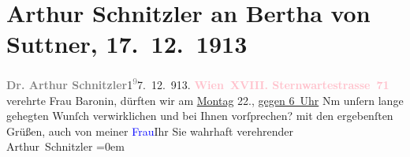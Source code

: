 

               \section[Arthur Schnitzler an Bertha von Suttner, 17. 12. 1913]{ Arthur Schnitzler an Bertha von Suttner,
                    17. 12. 1913}\nopagebreak{}\rehead{ }\normalsize\beginnumbering{} \toendnotes[C]{\smallbreak\pagebreak[2]} 
\toendnotes[C]{\smallbreak}\pstart
           \noindent{}{\pb}\textcolor{gray}{\textbf{Dr. Arthur Schnitzler}}\hfill 1\substVorne{}\textsuperscript{\textcolor{gray}{9}}\substDazwischen{}7\substHinten{}. 12. 913.\pend
           \pstart
           \textcolor{gray}{\textbf{\textcolor{pink}{Wien XVIII. Sternwartestrasse 71}{}\ledrightnote{\textcolor{pink}{Sternwartestraße}}}}\pend
           \pstart{}verehrte Frau Baronin, \pend\pstart
           dürften wir am \uline{Montag} 22., \uline{gegen 6 Uhr} Nm unſern lange gehegten Wunſch verwirklichen und bei Ihnen
                    vorſprechen?\pend
           \pstart
           mit den ergebenſten Grüßen, auch von meiner \textcolor{blue}{Frau}{}Ihr Sie wahrhaft verehrender{\\[\baselineskip]}\spacefill\mbox{Arthur Schnitzler}\pend
           \leftskip=0em{}\endnumbering{}  
      